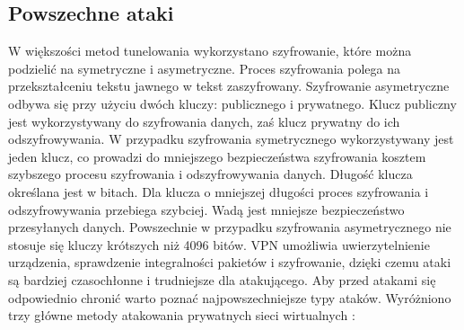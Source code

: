 \documentclass[12p]{article}
\begin{document}
\subsection{Powszechne ataki}
\quad W większości metod tunelowania wykorzystano szyfrowanie, które można podzielić na symetryczne i asymetryczne. Proces szyfrowania polega na przekształceniu tekstu jawnego w tekst zaszyfrowany. Szyfrowanie asymetryczne odbywa się przy użyciu dwóch kluczy: publicznego i prywatnego. Klucz publiczny jest wykorzystywany do szyfrowania danych, zaś klucz prywatny do ich odszyfrowywania. W przypadku szyfrowania symetrycznego wykorzystywany jest jeden klucz, co prowadzi do mniejszego bezpieczeństwa szyfrowania kosztem szybszego procesu szyfrowania i odszyfrowywania danych. 
Długość klucza określana jest w bitach. Dla klucza o mniejszej długości proces szyfrowania i odszyfrowywania przebiega szybciej. Wadą jest mniejsze bezpieczeństwo przesyłanych danych. Powszechnie w przypadku szyfrowania asymetrycznego nie stosuje się kluczy krótszych niż 4096 bitów. VPN umożliwia uwierzytelnienie urządzenia, sprawdzenie integralności pakietów i szyfrowanie, dzięki czemu ataki są bardziej czasochłonne i trudniejsze dla atakującego. Aby przed atakami się odpowiednio chronić warto poznać najpowszechniejsze typy ataków. Wyróżniono trzy główne metody atakowania prywatnych sieci wirtualnych :
\end{document}
